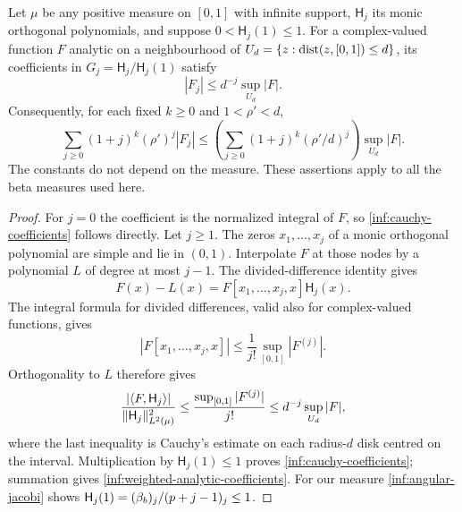 \begin{lemma}
\label{inf:analytic-coefficients}
Let $\mu$ be any positive measure on $[0,1]$ with infinite support,
$\mathsf H_j$ its monic orthogonal polynomials, and suppose $0<\mathsf H_j(1)\le1$.
For a complex-valued function $F$ analytic on a neighbourhood of
$U_d=\{z:\operatorname{dist}(z,[0,1])\le d\}$, its coefficients in
$G_j=\mathsf H_j/\mathsf H_j(1)$ satisfy
\begin{equation}\label{inf:cauchy-coefficients}
 |F_j|\le d^{-j}\sup_{U_d}|F|.
\end{equation}
Consequently, for each fixed $k\ge0$ and $1<\rho'<d$,
\begin{equation}\label{inf:weighted-analytic-coefficients}
 \sum_{j\ge0}(1+j)^k(\rho')^j|F_j|
 \le\left(\sum_{j\ge0}(1+j)^k(\rho'/d)^j\right)\sup_{U_d}|F|.
\end{equation}
The constants do not depend on the measure. These assertions apply
to all the beta measures used here.
\end{lemma}
\begin{proof}
For $j=0$ the coefficient is the normalized integral of $F$, so
\eqref{inf:cauchy-coefficients} follows directly. Let $j\ge1$.
The zeros $x_1,\ldots,x_j$ of a monic orthogonal polynomial are simple
and lie in $(0,1)$. Interpolate $F$ at those nodes by a polynomial
$L$ of degree at most $j-1$. The divided-difference identity gives
\[
 F(x)-L(x)=F[x_1,\ldots,x_j,x]\mathsf H_j(x).
\]
The integral formula for divided differences, valid also for
complex-valued functions, gives
\[
 |F[x_1,\ldots,x_j,x]|\le\frac1{j!}
                                  \sup_{[0,1]}|F^{(j)}|.
\]
Orthogonality to $L$ therefore gives
\[
 \frac{|\langle F,\mathsf H_j\rangle|}{\lVert \mathsf H_j\rVert_{L^2(\mu)}^2}
 \le\frac{\sup_{[0,1]}|F^{(j)}|}{j!}
 \le d^{-j}\sup_{U_d}|F|,
\]
where the last inequality is Cauchy's estimate on each radius-$d$
disk centred on the interval. Multiplication by $\mathsf H_j(1)\le1$
proves \eqref{inf:cauchy-coefficients}; summation gives
\eqref{inf:weighted-analytic-coefficients}.
For our measure \eqref{inf:angular-jacobi} shows
$\mathsf H_j(1)=(\beta_b)_j/(p+j-1)_j\le1$.
\end{proof}

